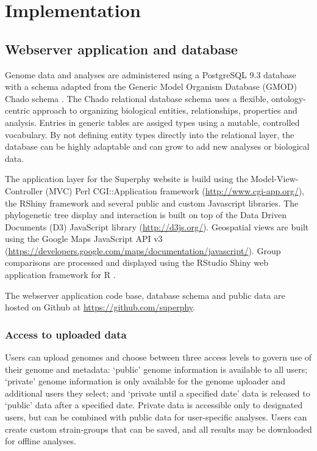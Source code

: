 \documentclass[doublespacing, linenumbers]{bmcart}
\begin{document}
\section{Implementation}
\subsection{Webserver application and database}

Genome data and analyses are administered using a PostgreSQL 9.3 database with a schema adapted from the Generic Model Organism Database (GMOD) Chado schema \cite{mungall_chado_2007}. The Chado relational database schema uses a flexible, ontology-centric approach to organizing biological entities, relationships, properties and analysis. Entries in generic tables are assiged types using a mutable, controlled vocabulary. By not defining entity types directly into the relational layer, the database can be highly adaptable and can grow to add new analyses or biological data.

The application layer for the Superphy website is build using the Model-View-Controller (MVC) Perl CGI::Application framework (\url{http://www.cgi-app.org/}), the RShiny framework and several public and custom Javascript libraries. The phylogenetic tree display and interaction is built on top of the Data Driven Documents (D3) JavaScript library (\url{http://d3js.org/}). Geospatial views are built using the Google Maps JavaScript API v3 (\url{https://developers.google.com/maps/documentation/javascript/}). Group comparisons are processed and displayed using the RStudio Shiny web application framework for R \cite{racine_rstudio:_2012}.

The webserver application code base, database schema and public data are hosted on Github at \url{https://github.com/superphy}.

\subsubsection{Access to uploaded data}
Users can upload genomes and choose between three access levels to govern use of their genome and metadata: `public' genome information is available to all users; `private' genome information is only available for the genome uploader and additional users they select; and `private until a specified date' data is released to `public' data after a specified date. Private data is accessible only to designated users, but can be combined with public data for user-specific analyses. Users can create custom strain-groups that can be saved, and all results may be downloaded for offline analyses.
\end{document}
